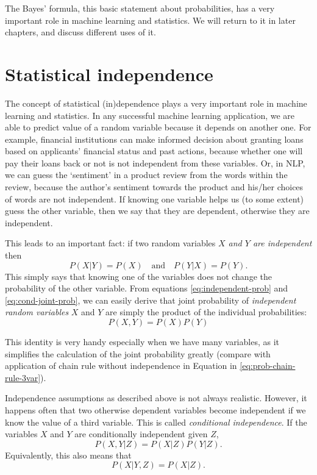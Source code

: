 The Bayes' formula,
this basic statement about probabilities,
has a very important role in machine learning and statistics.
We will return to it in later chapters, and discuss different uses of it.

\section{Statistical independence}

The concept of statistical (in)dependence plays
a very important role in machine learning and statistics.
In any successful machine learning application,
we are able to predict value of a random variable
because it depends on another one.
For example,
financial institutions can make informed decision about granting loans based on applicants'
financial status and past actions,
because whether one will pay their loans back or not is not independent from these variables.
Or, in NLP, we can guess the `sentiment' in a product review
from the words within the review,
because the author's sentiment towards the product
and his/her choices of words are not independent.
If knowing one variable helps us (to some extent) guess the other variable,
then we say that they are dependent,
otherwise they are independent.

This leads to an important fact:
if two random variables \emph{$X$ and $Y$ are independent} then
\begin{equation}\label{eq:independent-prob}
  P(X|Y) = P(X)\quad\text{and}\quad P(Y|X) = P(Y) .
\end{equation}
This simply says that knowing one of the variables does not change
the probability of the other variable.
From equations \ref{eq:independent-prob} and \ref{eq:cond-joint-prob},
we can easily derive that
joint probability of \emph{independent random variables} $X$ and $Y$ are
simply the product of the individual probabilities:
\[
  P(X,Y) = P(X) P(Y)
\]

This identity is very handy especially when we have many variables,
as it simplifies the calculation of the joint probability greatly
(compare with application of chain rule without independence
in Equation in \ref{eq:prob-chain-rule-3var}).

Independence assumptions
as described above is not always realistic.
However, it happens often that two otherwise dependent variables become
independent if we know the value of a third variable.
This is called \emph{conditional independence}.
If the variables $X$ and $Y$ are conditionally independent given $Z$,
\[
  P(X,Y|Z) = P(X|Z) P(Y|Z) .
\]
Equivalently, this also means that 
\[
  P(X|Y,Z) = P(X|Z).
\]

